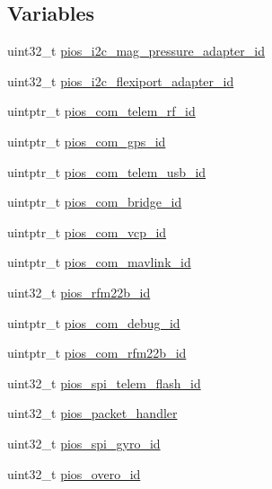 \subsection*{\-Variables}
\begin{DoxyCompactItemize}
\item 
uint32\-\_\-t \hyperlink{group___freedom_ga0bc1cddc7bfac02e5a765f1ff09ad29f}{pios\-\_\-i2c\-\_\-mag\-\_\-pressure\-\_\-adapter\-\_\-id}
\item 
uint32\-\_\-t \hyperlink{group___freedom_ga20b68de0b754d943d653d816aad86148}{pios\-\_\-i2c\-\_\-flexiport\-\_\-adapter\-\_\-id}
\item 
uintptr\-\_\-t \hyperlink{group___freedom_gae48e848f715b08971e23528feee79339}{pios\-\_\-com\-\_\-telem\-\_\-rf\-\_\-id}
\item 
uintptr\-\_\-t \hyperlink{group___freedom_ga05dca72c42c6c2b33fa62b8ee0fcb2ea}{pios\-\_\-com\-\_\-gps\-\_\-id}
\item 
uintptr\-\_\-t \hyperlink{group___freedom_ga513cc36d72b76de2fcb75ff233a79a4a}{pios\-\_\-com\-\_\-telem\-\_\-usb\-\_\-id}
\item 
uintptr\-\_\-t \hyperlink{group___freedom_gac040f05fa048688ee0269c2768698a14}{pios\-\_\-com\-\_\-bridge\-\_\-id}
\item 
uintptr\-\_\-t \hyperlink{group___freedom_gaaeb3e0d65ed5c6e7b921c54e1ad905db}{pios\-\_\-com\-\_\-vcp\-\_\-id}
\item 
uintptr\-\_\-t \hyperlink{group___freedom_gabdefeb92517c08b2db19b764db941de9}{pios\-\_\-com\-\_\-mavlink\-\_\-id}
\item 
uint32\-\_\-t \hyperlink{group___freedom_ga1e0b7d2eb8b8640e07daa1f381780972}{pios\-\_\-rfm22b\-\_\-id}
\item 
uintptr\-\_\-t \hyperlink{group___freedom_ga14dc9e3d330b80a37a9699c2112358e0}{pios\-\_\-com\-\_\-debug\-\_\-id}
\item 
uintptr\-\_\-t \hyperlink{group___freedom_ga960a23c3c0c4fd41826d65e01651b737}{pios\-\_\-com\-\_\-rfm22b\-\_\-id}
\item 
uint32\-\_\-t \hyperlink{group___freedom_gabcea731eedc7b51eae0e4074e35fc8c1}{pios\-\_\-spi\-\_\-telem\-\_\-flash\-\_\-id}
\item 
uint32\-\_\-t \hyperlink{group___freedom_gab0199d5aedb7be35cb1d6880ee21f8ac}{pios\-\_\-packet\-\_\-handler}
\item 
uint32\-\_\-t \hyperlink{group___freedom_gaa3af759a1b634a729e4688dc40026875}{pios\-\_\-spi\-\_\-gyro\-\_\-id}
\item 
uint32\-\_\-t \hyperlink{group___freedom_ga6068626ce5d15d09ba077204ea2fd43d}{pios\-\_\-overo\-\_\-id}

\end{DoxyCompactItemize}
